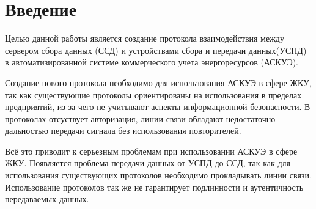 \newpage
\section{Введение}
\setcounter{figure}{0}


Целью данной работы является создание протокола взаимодействия между сервером сбора данных (ССД) и устройствами сбора и передачи данных(УСПД) в автоматизированной системе коммерческого учета энергоресурсов (АСКУЭ).

Создание нового протокола необходимо для использования АСКУЭ в сфере ЖКУ, так как существующие протоколы ориентированы на использования в пределах предприятий, из-за чего не учитывают аспекты информационной безопасности. В протоколах отсуствует авторизация, линии связи обладают недостаточно дальностью передачи сигнала без использования повторителей. 

Всё это приводит к серьезным проблемам при использовании АСКУЭ в сфере ЖКУ. Появляется проблема передачи данных от УСПД до ССД, так как для использования существующих протоколов необходимо прокладывать линии связи. Использование протоколов так же не гарантирует подлинности и аутентичность передаваемых данных. 

